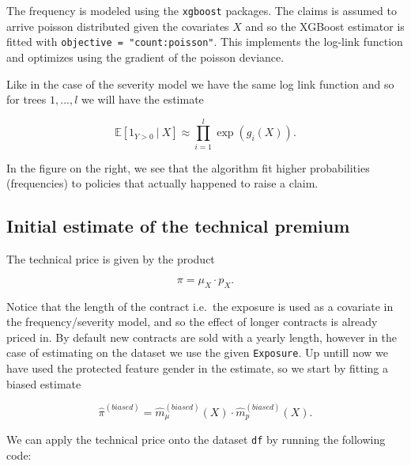 \documentclass[
]{article}
\begin{document}
The frequency is modeled using the \texttt{xgboost} packages. The claims
is assumed to arrive poisson distributed given the covariates \(X\) and
so the XGBoost estimator is fitted with
\texttt{objective\ =\ "count:poisson"}. This implements the log-link
function and optimizes using the gradient of the poisson deviance.

Like in the case of the severity model we have the same log link
function and so for trees \(1,...,l\) we will have the estimate

\[
\mathbb E[1_{Y>0}\ \vert\ X]\approx\prod_{i=1}^l\exp(g_i(X)).
\]

In the figure on the right, we see that the algorithm fit higher
probabilities (frequencies) to policies that actually happened to raise
a claim.

\hypertarget{initial-estimate-of-the-technical-premium}{%
\subsection{Initial estimate of the technical
premium}\label{initial-estimate-of-the-technical-premium}}

The technical price is given by the product

\[
\pi=\mu_X\cdot p_X.
\]

Notice that the length of the contract i.e.~the exposure is used as a
covariate in the frequency/severity model, and so the effect of longer
contracts is already priced in. By default new contracts are sold with a
yearly length, however in the case of estimating on the dataset we use
the given \texttt{Exposure}. Up untill now we have used the protected
feature gender in the estimate, so we start by fitting a biased estimate

\[
\hat \pi^{(biased)}=\hat m_\mu^{(biased)}(X)\cdot\hat m_p^{(biased)}(X).
\]

We can apply the technical price onto the dataset \texttt{df} by running
the following code:
\end{document}
